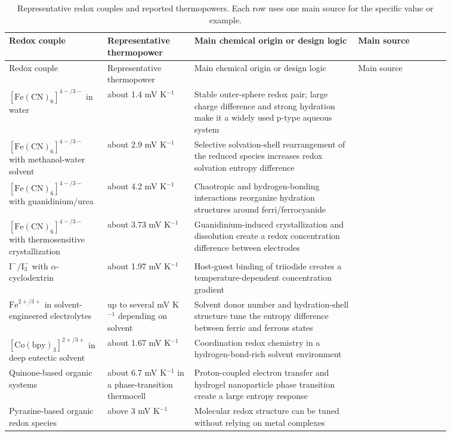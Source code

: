 \documentclass[a4paper,12pt]{report}
\begin{document}
\begin{longtable}{>{\raggedright\arraybackslash}p{0.19\linewidth}
>{\raggedright\arraybackslash}p{0.17\linewidth}
>{\raggedright\arraybackslash}p{0.32\linewidth}
>{\raggedright\arraybackslash}p{0.18\linewidth}}
\caption{Representative redox couples and reported thermopowers. Each row uses
one main source for the specific value or example.}\\
\toprule
Redox couple & Representative thermopower & Main chemical origin or design
logic & Main source \\
\midrule
\endfirsthead
\toprule
Redox couple & Representative thermopower & Main chemical origin or design
logic & Main source \\
\midrule
\endhead
$[\mathrm{Fe(CN)}_6]^{4-/3-}$ in water & about 1.4 mV K$^{-1}$ & Stable
outer-sphere redox pair; large charge difference and strong hydration make it a
widely used p-type aqueous system & \citep{duan2018aqueous} \\
$[\mathrm{Fe(CN)}_6]^{4-/3-}$ with methanol-water solvent & about 2.9 mV
K$^{-1}$ & Selective solvation-shell rearrangement of the reduced species
increases redox solvation entropy difference & \citep{kim2017high} \\
$[\mathrm{Fe(CN)}_6]^{4-/3-}$ with guanidinium/urea & about 4.2 mV K$^{-1}$
& Chaotropic and hydrogen-bonding interactions reorganize hydration structures
around ferri/ferrocyanide & \citep{duan2018aqueous} \\
$[\mathrm{Fe(CN)}_6]^{4-/3-}$ with thermosensitive crystallization & about
3.73 mV K$^{-1}$ & Guanidinium-induced crystallization and dissolution create
a redox concentration difference between electrodes & \citep{yu2020thermosensitive} \\
$\mathrm{I}^{-}/\mathrm{I}_3^{-}$ with $\alpha$-cyclodextrin & about 1.97
mV K$^{-1}$ & Host-guest binding of triiodide creates a temperature-dependent
concentration gradient & \citep{zhou2016supramolecular} \\
$\mathrm{Fe}^{2+/3+}$ in solvent-engineered electrolytes & up to several mV
K$^{-1}$ depending on solvent & Solvent donor number and hydration-shell
structure tune the entropy difference between ferric and ferrous states &
\citep{chen2023solvation} \\
$[\mathrm{Co(bpy)}_3]^{2+/3+}$ in deep eutectic solvent & about 1.67 mV
K$^{-1}$ & Coordination redox chemistry in a hydrogen-bond-rich solvent
environment & \citep{antariksa2021deep} \\
Quinone-based organic systems & about 6.7 mV K$^{-1}$ in a phase-transition
thermocell & Proton-coupled electron transfer and hydrogel nanoparticle phase
transition create a large entropy response &
\citep{guo2020nanoparticle} \\
Pyrazine-based organic redox species & above 3 mV K$^{-1}$ & Molecular redox
structure can be tuned without relying on metal complexes & \citep{lee2025pyrazine} \\
\bottomrule
\end{longtable}
\end{document}
